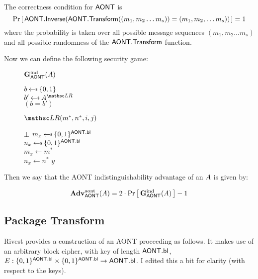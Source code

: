 \documentclass[11pt,twoside]{article}
\begin{document}
The correctness condition for $\mathsf{AONT}$ is $${\Pr\left[\,{\mathsf{AONT.Inverse}(\mathsf{AONT.Transform}((m_1,m_2\dots m_s))=(m_1,m_2,\dots m_s))}\,\right]} = 1$$ where the probability is taken over all possible message sequences $(m_1,m_2\dots m_s)$ and all possible randomness of the $\mathsf{AONT.Transform}$ function. 

Now we can define the following security game:

\pagebreak
\begin{figure}[h]
{
\underline{$\mathbf{G}_{\mathsf{AONT}}^\text{ind}(A)$}

\begin{algorithm}[H]
$b \getsr \bits$\\
$b' \getsr \advA^{\LRO}$\\
\Return $(b=b')$
\end{algorithm}

\smallskip
\underline{$\LRO(m^*,n^*,i,j)$}

\begin{algorithm}[H]
{
\Return $\bot$
}
{
{
$m_x \getsr \bits^\schemefont{AONT.bl}$\\
$n_x \getsr \bits^\schemefont{AONT.bl}$\\

}
{
$m_x\gets m^*$\\
$n_x\gets n^*$
}
}
\Return $y$
\end{algorithm}
}
\end{figure}


Then we say that the AONT indistinguishability advantage of an $A$ is given by: 

$$\textbf{Adv}^\text{aont}_{\mathsf{AONT}}(A)=2\cdot{\Pr\left[\,{\mathbf{G}_{\mathsf{AONT}}^\text{ind}(A)}\,\right]} - 1$$

\subsection{Package Transform}

Rivest provides a construction of an AONT proceeding as follows. It makes use of an arbitrary block cipher, with key of length $\mathsf{AONT.bl}$, $E : \{0,1\}^{\mathsf{AONT.bl}} \times \{0,1\}^{\mathsf{AONT.bl}}\rightarrow \mathsf{AONT.bl}$. I edited this a bit for clarity (with respect to the keys). 
\end{document}
